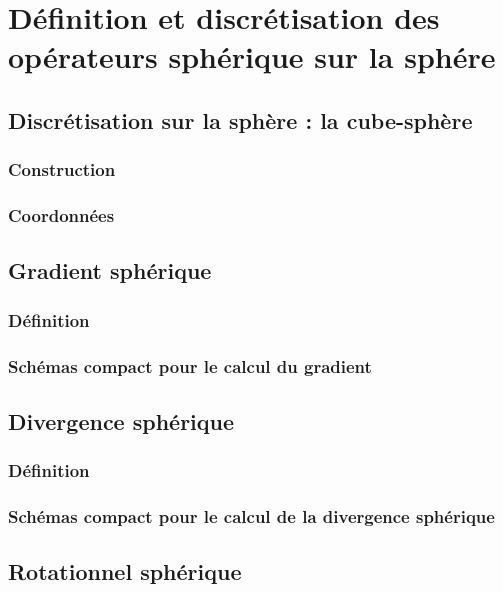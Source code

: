 
\chapter{Définition et discrétisation des opérateurs sphérique sur la sphére}

\section{Discrétisation sur la sphère : la cube-sphère}

\subsection{Construction}

\subsection{Coordonnées}

\section{Gradient sphérique}

\subsection{Définition}

\subsection{Schémas compact pour le calcul du gradient}

\section{Divergence sphérique}

\subsection{Définition}

\subsection{Schémas compact pour le calcul de la divergence sphérique}

\section{Rotationnel sphérique}

